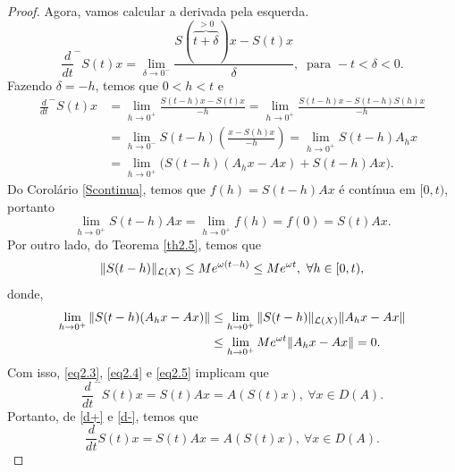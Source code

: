 \begin{proof}
Agora, vamos calcular a derivada pela esquerda.
\[
\frac{d}{dt}^- S(t)x = \lim_{\delta \to 0^-} \frac{S(\overbrace{t+\delta}^{>0})x - S(t)x}{\delta}, \ \text{ para } -t < \delta < 0.
\]
Fazendo $\delta=-h$, temos que $0<h<t$ e 
\begin{equation}\label{eq2.3}
\begin{split}
    \frac{d}{dt}^- S(t)x 
    & = \lim_{h \to 0^+} \frac{S(t-h)x - S(t)x}{-h}=
    \lim_{h \to 0^+} \frac{S(t-h)x - S(t-h)S(h)x}{-h}\\
    &=  \lim_{h \to 0^-} S(t-h)\left(\frac{x - S(h)x}{-h}\right)
    =\lim_{h \to 0^+} S(t-h)A_hx\\
    &= \lim_{h \to 0^+} \Big(S(t-h)(A_hx-Ax)+S(t-h)Ax\Big).
\end{split}
\end{equation}
Do Corolário \eqref{Scontinua}, temos que $f(h)=S(t-h)Ax$ é contínua em $[0,t)$, portanto
\begin{equation}\label{eq2.4}
\lim_{h \to 0^+} S(t-h)Ax=\lim_{h \to 0^+}f(h)=f(0)=S(t)Ax.
\end{equation}
Por outro lado, do Teorema \ref{th2.5}, temos que
\[\|S(t-h)\|_{\mathcal{L}(X)}\leq Me^{\omega(t-h)}\leq Me^{\omega t},\ \forall h\in [0,t),\]
donde,
\begin{equation}\label{eq2.5}
\begin{split}
 \lim_{h \to 0^+}\|S(t-h)(A_hx-Ax)\|
 & \leq \lim_{h \to 0^+}\|S(t-h)\|_{\mathcal{L}(X)}\|A_hx-Ax\|\\
 & \leq \lim_{h \to 0^+}Me^{\omega t}\|A_hx-Ax\|=0.
\end{split}
\end{equation}
Com isso, \eqref{eq2.3}, \eqref{eq2.4} e \eqref{eq2.5} implicam que 
\begin{equation}\label{d-}
\frac{d}{dt}^-S(t)x=S(t)Ax=A(S(t)x),\ \forall x\in D(A).    
\end{equation}
Portanto, de \eqref{d+} e \eqref{d-}, temos que
\begin{equation*}
\frac{d}{dt}S(t)x=S(t)Ax=A(S(t)x),\ \forall x\in D(A).    
\end{equation*}
\end{proof}



